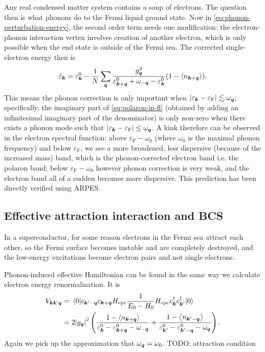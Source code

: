 \documentclass[hyperref, a4paper]{article}
\begin{document}
Any real condensed matter system contains a soup of electrons.
The question then is what phonons do to the Fermi liquid ground state.
Now in \eqref{eq:phonon-perturbation-energy}, 
the second order term needs one modification:
the electron-phonon interaction vertex 
involves creation of another electron, 
which is only possible when the end state is outside of the Fermi sea.
The corrected single-electron energy then is 
\begin{equation}
    \tilde{\varepsilon}_{\vb*{k}} = \varepsilon_{\vb*{k}}^{0} - \frac{1}{N} \sum_{\vb*{q}} \frac{g_{\vb*{q}}^2}{\varepsilon^0_{\vb*{k} + \vb*{q}} + \omega_{-\vb*{q}} - \varepsilon_{\vb*{k}}^0} (1 - \expval{n_{\vb*{k} + \vb*{q}}}).
    \label{eq:polaron-in-fl}
\end{equation}
This means the phonon correction is only important when $\abs{\varepsilon_{\vb*{k}} - \varepsilon_{\text{F}}} \lesssim \omega_{\vb*{q}}$;
specifically, the imaginary part of \eqref{eq:polaron-in-fl} (obtained by adding an infinitesimal imaginary part of the denominator) 
is only non-zero when there exists a phonon mode such that $\abs{\varepsilon_{\vb*{k}} - \varepsilon_{\text{F}}} \leq \omega_{\vb*{q}}$.
A kink therefore can be observed in the electron spectral function:
above $\varepsilon_{\text{F}} - \omega_0$ (where $\omega_0$ is the maximal phonon frequency)
and below $\varepsilon_{\text{F}}$, 
we see a more broadened, less dispersive (because of the increased mass) band, 
which is the phonon-corrected electron band i.e. the polaron band;
below $\varepsilon_{\text{F}} - \omega_0$ however phonon correction is very weak,
and the electron band all of a sudden becomes more dispersive.
This prediction has been directly verified using ARPES.

\subsection{Effective attraction interaction and BCS}

In a superconductor, for some reason electrons in the Fermi sea attract each other, 
so the Fermi surface becomes instable 
and are completely destroyed,
and the low-energy excitations become electron pairs and not single electrons.

Phonon-induced effective Hamiltonian can be found in the same way we calculate electron energy renormalization.
It is 
\begin{equation}
    \begin{aligned}
        V_{\vb*{k} \vb*{k}' \vb*{q}} &= \mel*{0}{c_{\vb*{k}' - \vb*{q}} c_{\vb*{k} + \vb*{q}} H_{\text{epc}} \frac{1}{E_0 - H_0} H_{\text{epc}} c^\dagger_{\vb*{k}} c^\dagger_{\vb*{k}'}}{0} \\
        &= 2 \abs{g_{\vb*{q}}}^2 \left(
            \frac{1 - \expval{n_{\vb*{k} + \vb*{q}}}}{\varepsilon^0_{\vb*{k}} - \varepsilon^0_{\vb*{k} + \vb*{q}} - \omega_{- \vb*{q}}}
            + \frac{1 - \expval{n_{\vb*{k}' - \vb*{q}}}}{\varepsilon^0_{\vb*{k}'} - \varepsilon^0_{\vb*{k}' - \vb*{q}} - \omega_{\vb*{q}}}
        \right).
    \end{aligned}
\end{equation}
Again we pick up the approximation that $\omega_{\vb*{q}} = \omega_0$.
TODO: attraction condition
\end{document}
